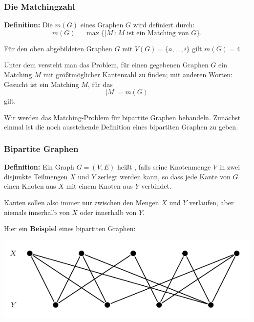 \documentclass[smaller]{beamer}
\begin{document}
\begin{frame}
 \frametitle{Die Matchingzahl}
 \textbf{Definition:}
Die  $m(G)$ eines Graphen $G$ wird definiert durch:
\[
m(G) = \max{\big\{ |M| : M \text{ ist ein Matching von $G$} \big\}}.
\]

Für den oben abgebildeten Graphen $G$ mit $V(G) = \bigl\{ a,\ldots,i \bigr\}$ gilt $m(G) = 4$. \\ \vspace*{0.2cm}

Unter dem  versteht man das Problem, für einen gegebenen Graphen $G$ ein Matching $M$ mit größtmöglicher Kantenzahl zu finden; mit anderen Worten: Gesucht ist ein Matching $M$, für das
\[
|M| = m(G)
\] 
gilt. \\ \vspace*{0.2cm}

Wir werden das \alert{Matching-Problem für bipartite Graphen} behandeln. Zunächst einmal ist die noch ausstehende Definition eines bipartiten Graphen zu geben.
\end{frame}

\begin{frame}
\frametitle{Bipartite Graphen}
\textbf{Definition:} Ein Graph $G=(V,E)$ heißt , falls seine Knotenmenge $V$ in zwei disjunkte Teilmengen $X$ und $Y$ zerlegt werden kann, so dass jede Kante von $G$ einen Knoten aus $X$ mit einem Knoten aus $Y$ verbindet.\\ \vspace*{0.2cm}

Kanten sollen also immer nur zwischen den Mengen $X$ und $Y$ verlaufen, aber \alert{niemals innerhalb von $X$ oder innerhalb von $Y$}. \\ \vspace*{0.2cm}

Hier ein \textbf{Beispiel} eines bipartiten Graphen:
\begin{center}
 \includegraphics{fig35.pdf}
\end{center}
\end{frame}
\end{document}
